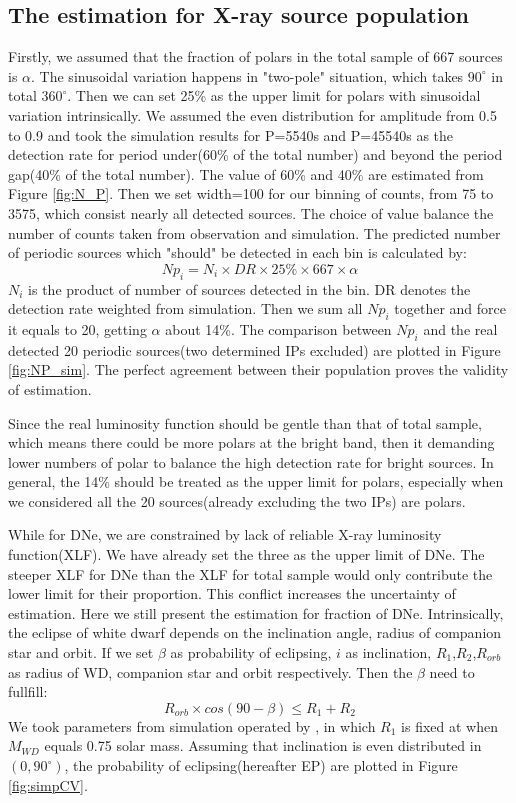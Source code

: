 \documentclass[twoside,twocolumn]{aastex63}
\begin{document}
\subsection{The estimation for X-ray source population}
Firstly, we assumed that the fraction of polars in the total sample of 667 sources is $\alpha$. The sinusoidal variation happens in "two-pole" situation, which takes $90^\circ$ in total $360^\circ$. Then we can set 25\% as the upper limit for polars with sinusoidal variation intrinsically. We assumed the even distribution for amplitude from 0.5 to 0.9 and took the simulation results for P=5540s and P=45540s as the detection rate for period under(60\% of the total number) and beyond the period gap(40\% of the total number). The value of 60\% and 40\% are estimated from Figure \ref{fig:N_P}. Then we set width=100 for our binning of counts, from 75 to 3575, which consist nearly all detected sources. The choice of value balance the number of counts taken from observation and simulation. 
 The predicted number of periodic sources which "should" be detected in each bin is calculated by:
\begin{equation}
Np_{i}=N_i\times DR \times 25\% \times 667 \times \alpha	
\end{equation}
$N_i$ is the product of number of sources detected in the bin. DR denotes the detection rate weighted from simulation. Then we sum all $Np_{i}$ together and force it equals to 20,  getting $\alpha$ about 14\%. The comparison between $Np_{i}$ and the real detected 20 periodic sources(two determined IPs excluded) are plotted in Figure \ref{fig:NP_sim}. The perfect agreement between their population proves the validity of estimation.

Since the real luminosity function should be gentle than that of  total sample, which means there could be more polars at the bright band, then it demanding lower numbers of polar to balance the high detection rate for bright sources. 
In general, the 14\% should be treated as the upper limit for polars, especially when we considered all the 20 sources(already excluding the two IPs) are polars. 

While for DNe, we are constrained by lack of reliable X-ray luminosity function(XLF). We have already set the three as the upper limit of DNe. The steeper XLF for DNe than the XLF for total sample would only contribute the lower limit for their proportion. This conflict increases the  uncertainty of estimation. Here we still present the estimation for fraction of DNe.
Intrinsically, the eclipse of white dwarf depends on the inclination angle, radius of companion star and orbit. If we set $\beta$ as probability of eclipsing, $i$ as inclination, $R_1$,$R_2$,$R_{orb}$ as radius of WD, companion star and orbit respectively. Then the $\beta$ need to fullfill:
\begin{equation}
{R_{orb}\times cos(90-\beta)}\leq { R_1+R_2}
\end{equation}
We took parameters from simulation operated by \citep{2011ApJS..194...28K}, in which $R_1$ is fixed at when $M_{WD}$ equals 0.75 solar mass. Assuming that inclination is even distributed in $(0,90^\circ)$, the probability of eclipsing(hereafter EP) are plotted in Figure \ref{fig:simpCV}.
\end{document}
